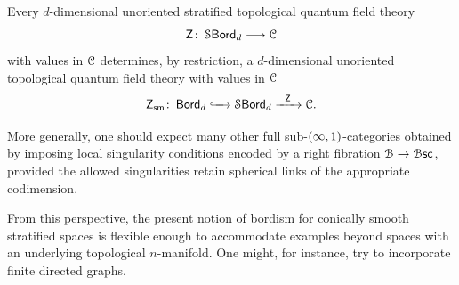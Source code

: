 \begin{observation}
    Every $d$-dimensional unoriented stratified topological quantum field theory 
    \begin{equation}
    \mathsf Z \colon \operatorname{\mathcal S\mathsf{Bord}}_d \longrightarrow \mathcal C
    \end{equation} with values in $\mathcal C$ determines, by restriction, a $d$-dimensional unoriented topological quantum field theory with values in $\mathcal C$ 
    \begin{equation}
        \mathsf Z_{\sf sm} \colon \operatorname{\mathsf{Bord}}_d \xhookrightarrow{\,\,\,\,\,\,\,\,} \operatorname{\mathcal S\mathsf{Bord}}_d \xrightarrow{\,\,\,\, \mathsf Z\,\,\,\,} \mathcal C.
    \end{equation}
\end{observation}

More generally, one should expect many other full sub-$(\operatorname{\infty},1)$-categories obtained by imposing local singularity conditions encoded by a right fibration $\mathcal B \rightarrow \operatorname{\mathcal B\mathsf{sc}}$, provided the allowed singularities retain spherical links of the appropriate codimension.

From this perspective, the present notion of bordism for conically smooth stratified spaces is flexible enough to accommodate examples beyond spaces with an underlying topological $n$-manifold. One might, for instance, try to incorporate finite directed graphs.

